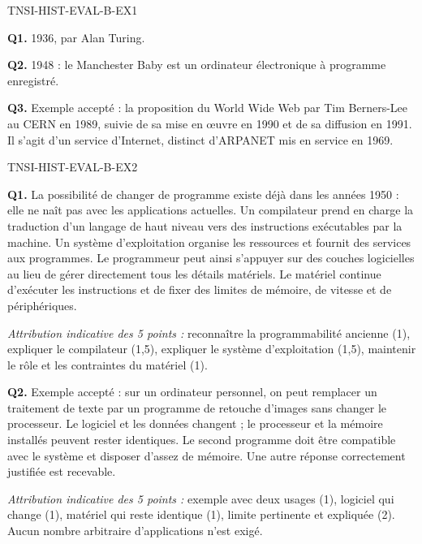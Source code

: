 
\begin{corrige}{TNSI-HIST-EVAL-B-EX1}

\textbf{Q1.} 1936, par Alan Turing.

\textbf{Q2.} 1948 : le Manchester Baby est un ordinateur électronique à programme enregistré.

\textbf{Q3.} Exemple accepté : la proposition du World Wide Web par Tim Berners-Lee au CERN en 1989, suivie de sa mise en œuvre en 1990 et de sa diffusion en 1991. Il s'agit d'un service d'Internet, distinct d'ARPANET mis en service en 1969.

\end{corrige}

\begin{corrige}{TNSI-HIST-EVAL-B-EX2}

\textbf{Q1.} La possibilité de changer de programme existe déjà dans les années 1950 : elle ne naît pas avec les applications actuelles. Un compilateur prend en charge la traduction d'un langage de haut niveau vers des instructions exécutables par la machine. Un système d'exploitation organise les ressources et fournit des services aux programmes. Le programmeur peut ainsi s'appuyer sur des couches logicielles au lieu de gérer directement tous les détails matériels. Le matériel continue d'exécuter les instructions et de fixer des limites de mémoire, de vitesse et de périphériques.

\emph{Attribution indicative des 5 points :} reconnaître la programmabilité ancienne (1), expliquer le compilateur (1,5), expliquer le système d'exploitation (1,5), maintenir le rôle et les contraintes du matériel (1).

\textbf{Q2.} Exemple accepté : sur un ordinateur personnel, on peut remplacer un traitement de texte par un programme de retouche d'images sans changer le processeur. Le logiciel et les données changent ; le processeur et la mémoire installés peuvent rester identiques. Le second programme doit être compatible avec le système et disposer d'assez de mémoire. Une autre réponse correctement justifiée est recevable.

\emph{Attribution indicative des 5 points :} exemple avec deux usages (1), logiciel qui change (1), matériel qui reste identique (1), limite pertinente et expliquée (2). Aucun nombre arbitraire d'applications n'est exigé.

\end{corrige}

